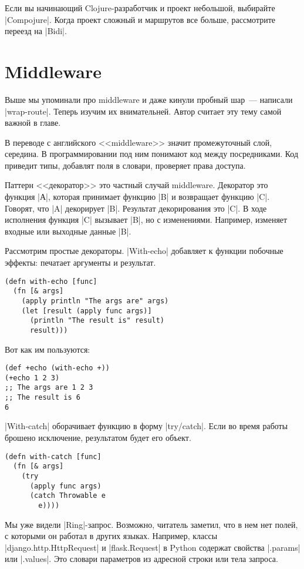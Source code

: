Если вы начинающий Clojure-разработчик и проект небольшой, выбирайте
\spverb|Compojure|. Когда проект сложный и маршрутов все больше, рассмотрите
переезд на \spverb|Bidi|.

\section{Middleware}

Выше мы упоминали про middleware и даже кинули пробный шар~--- написали
\spverb|wrap-route|. Теперь изучим их внимательней. Автор считает эту тему самой
важной в главе.

В переводе с английского <<middleware>> значит промежуточный слой, середина. В
программировании под ним понимают код между посредниками. Код приведит типы,
добавлят поля в словари, проверяет права доступа.

Паттерн <<декоратор>> это частный случай middleware. Декоратор это функция
\spverb|А|, которая принимает функцию \spverb|B| и возвращает функцию
\spverb|C|. Говорят, что \spverb|A| декорирует \spverb|B|. Результат
декорирования это \spverb|C|. В ходе исполнения функция \spverb|C| вызывает
\spverb|B|, но с изменениями. Например, изменяет входные или выходные данные
\spverb|B|.

Рассмотрим простые декораторы. \spverb|With-echo| добавляет к функции побочные
эффекты: печатает аргументы и результат.

\begin{verbatim}
(defn with-echo [func]
  (fn [& args]
    (apply println "The args are" args)
    (let [result (apply func args)]
      (println "The result is" result)
      result)))
\end{verbatim}

Вот как им пользуются:

\begin{verbatim}
(def +echo (with-echo +))
(+echo 1 2 3)
;; The args are 1 2 3
;; The result is 6
6
\end{verbatim}

\spverb|With-catch| оборачивает функцию в форму \spverb|try/catch|. Если во
время работы брошено исключение, результатом будет его объект.

\begin{verbatim}
(defn with-catch [func]
  (fn [& args]
    (try
      (apply func args)
      (catch Throwable e
        e))))
\end{verbatim}

Мы уже видели \spverb|Ring|-запрос. Возможно, читатель заметил, что в нем нет
полей, с которыми он работал в других языках. Например, классы
\spverb|django.http.HttpRequest| и \spverb|flask.Request| в Python содержат
свойства \spverb|.params| или \spverb|.values|. Это словари параметров из
адресной строки или тела запроса.

